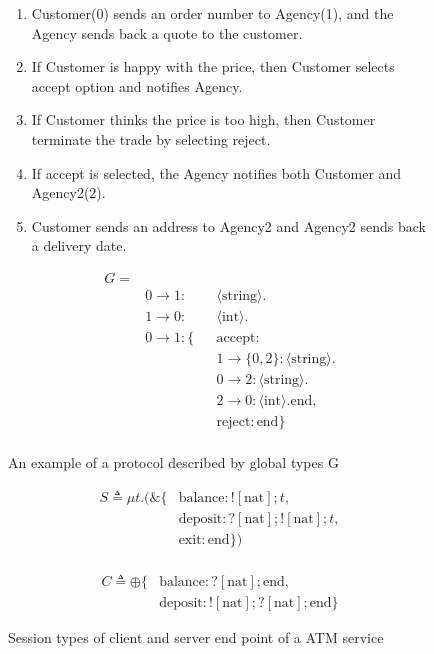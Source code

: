 \begin{figure}[ht]
  \begin{minipage}{0.45\textwidth}
    \begin{enumerate}
      \item Customer(0) sends an order number to Agency(1), and the Agency sends back a quote to the customer.
      \item If Customer is happy with the price, then Customer selects accept option and notifies Agency.
      \item If Customer thinks the price is too high, then Customer terminate the trade by selecting reject.
      \item If accept is selected, the Agency notifies both Customer and Agency2(2). 
      \item Customer sends an address to Agency2 and Agency2 sends back a delivery date.
    \end{enumerate}
  \end{minipage}
  \hfill
  \begin{minipage}{0.45\textwidth}
    \begin{align*}
      G = \\
      & 0 \rightarrow 1: && \langle \text{string} \rangle .\\
      & 1 \rightarrow 0: && \langle \text{int} \rangle .\\
      & 0 \rightarrow 1: \{ && \text{accept}: \\
      & && 1 \rightarrow \{ 0, 2 \}: \langle \text{string} \rangle . \\
      & &&  0 \rightarrow 2: \langle \text{string} \rangle .\\
      & &&  2 \rightarrow 0: \langle \text{int} \rangle . \text{end}, \\
      & && \text{reject}: \text{end} \} \\
    \end{align*}
  \end{minipage}
  \caption{An example of a protocol described by global types G}
  \label{b:mpst:gtex}
\end{figure}
\begin{figure}[ht]
  \begin{minipage}{0.45\textwidth}
    \begin{align*}
      S \triangleq \mu t.(\&\{ & \text{balance}: ![\text{nat}];t, \\
        & \text{deposit}: ?[\text{nat}];![\text{nat}];t, \\
        & \text{exit}: \text{end}\}) \\
    \end{align*}
  \end{minipage}
  \hfill
  \begin{minipage}{0.45\textwidth}
    \begin{align*}
      C \triangleq \oplus \{ &\text{balance}: ?[\text{nat}];\text{end}, \\
                             &\text{deposit}: ![\text{nat}];?[\text{nat}];\text{end} \} 
    \end{align*}
  \end{minipage}
  \caption{Session types of client and server end point of a ATM service}
  \label{b:mpst:ltex}
\end{figure}
